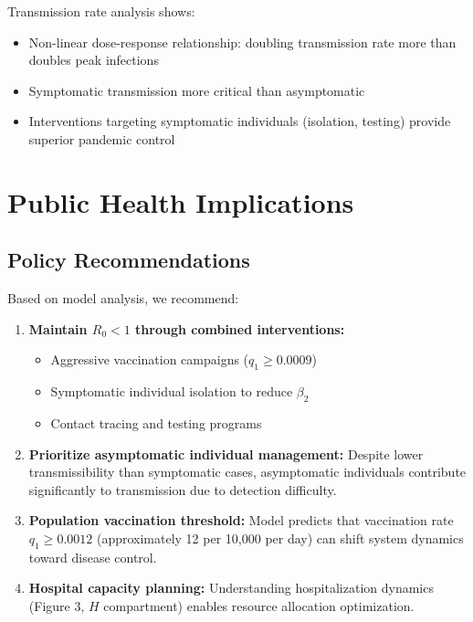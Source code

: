\documentclass[12pt,a4paper]{report}
\begin{document}
Transmission rate analysis shows:
\begin{itemize}
    \item Non-linear dose-response relationship: doubling transmission rate more than doubles peak infections
    \item Symptomatic transmission more critical than asymptomatic
    \item Interventions targeting symptomatic individuals (isolation, testing) provide superior pandemic control
\end{itemize}

\section{Public Health Implications}

\subsection{Policy Recommendations}

Based on model analysis, we recommend:

\begin{enumerate}
    \item \textbf{Maintain $R_0 < 1$ through combined interventions:}
    \begin{itemize}
        \item Aggressive vaccination campaigns ($q_1 \geq 0.0009$)
        \item Symptomatic individual isolation to reduce $\beta_2$
        \item Contact tracing and testing programs
    \end{itemize}
    
    \item \textbf{Prioritize asymptomatic individual management:} 
    Despite lower transmissibility than symptomatic cases, asymptomatic individuals contribute significantly to transmission due to detection difficulty.
    
    \item \textbf{Population vaccination threshold:}
    Model predicts that vaccination rate $q_1 \geq 0.0012$ (approximately 12 per 10,000 per day) can shift system dynamics toward disease control.
    
    \item \textbf{Hospital capacity planning:}
    Understanding hospitalization dynamics (Figure 3, $H$ compartment) enables resource allocation optimization.
\end{enumerate}
\end{document}
